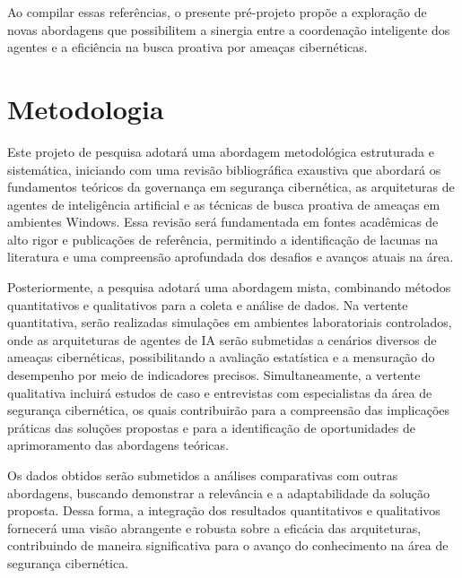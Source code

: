 \documentclass[article,12pt,a4paper]{abntex2}
\begin{document}
Ao compilar essas referências, o presente pré-projeto propõe a exploração de novas abordagens que possibilitem a sinergia entre a coordenação inteligente dos agentes e a eficiência na busca proativa por ameaças cibernéticas.

\section{Metodologia}
Este projeto de pesquisa adotará uma abordagem metodológica estruturada e sistemática, iniciando com uma revisão bibliográfica exaustiva que abordará os fundamentos teóricos da governança em segurança cibernética, as arquiteturas de agentes de inteligência artificial e as técnicas de busca proativa de ameaças em ambientes Windows. Essa revisão será fundamentada em fontes acadêmicas de alto rigor e publicações de referência, permitindo a identificação de lacunas na literatura e uma compreensão aprofundada dos desafios e avanços atuais na área.

Posteriormente, a pesquisa adotará uma abordagem mista, combinando métodos quantitativos e qualitativos para a coleta e análise de dados. Na vertente quantitativa, serão realizadas simulações em ambientes laboratoriais controlados, onde as arquiteturas de agentes de IA serão submetidas a cenários diversos de ameaças cibernéticas, possibilitando a avaliação estatística e a mensuração do desempenho por meio de indicadores precisos. Simultaneamente, a vertente qualitativa incluirá estudos de caso e entrevistas com especialistas da área de segurança cibernética, os quais contribuirão para a compreensão das implicações práticas das soluções propostas e para a identificação de oportunidades de aprimoramento das abordagens teóricas.

Os dados obtidos serão submetidos a análises comparativas com outras abordagens, buscando demonstrar a relevância e a adaptabilidade da solução proposta. Dessa forma, a integração dos resultados quantitativos e qualitativos fornecerá uma visão abrangente e robusta sobre a eficácia das arquiteturas, contribuindo de maneira significativa para o avanço do conhecimento na área de segurança cibernética.
\end{document}
